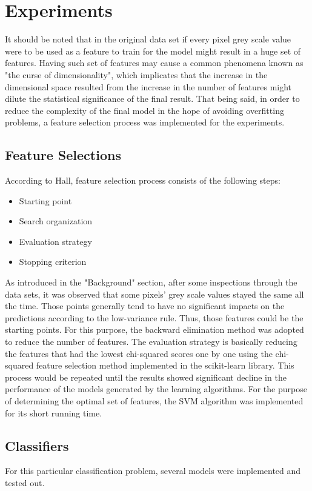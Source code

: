 
\section{Experiments}
\label{sec:expts}
It should be noted that in the original data set if every pixel grey scale value
 were to be used as a feature to train for the model might result in a huge set
 of features. Having such set of features may cause a common phenomena known as
 "the curse of dimensionality", which implicates that the increase in the
 dimensional space resulted from the increase in the number of features might
 dilute the statistical significance of the final result.\cite{bellman}
That being said, in order to reduce the complexity of the final model in the
hope of avoiding overfitting problems, a feature selection process was
implemented for the experiments.\cite{hall}

\subsection{Feature Selections}
\label{feature}
According to Hall, feature selection process consists of the following steps:
\begin{itemize}
	\item Starting point
	\item Search organization
	\item Evaluation strategy
	\item Stopping criterion

\end{itemize}
As introduced in the "Background" section, after some inspections through the
data sets, it was observed that some pixels' grey scale values stayed the same
all the time. Those points generally tend to have no significant impacts on the
predictions according to the low-variance rule. Thus, those features could be
the starting points. For this purpose, the backward elimination method was
adopted to reduce the number of features.\cite{hall}
The evaluation strategy is basically reducing the features that had the lowest
chi-squared scores one by one using the chi-squared feature selection method
implemented in the scikit-learn library. This process would be repeated until
the results showed significant decline in the performance of the models
generated by the learning algorithms. For the purpose of determining the
optimal set of features, the SVM algorithm was implemented for its short
running time.

\subsection{Classifiers}
\label{class}
For this particular classification problem, several models were implemented and
tested out.
